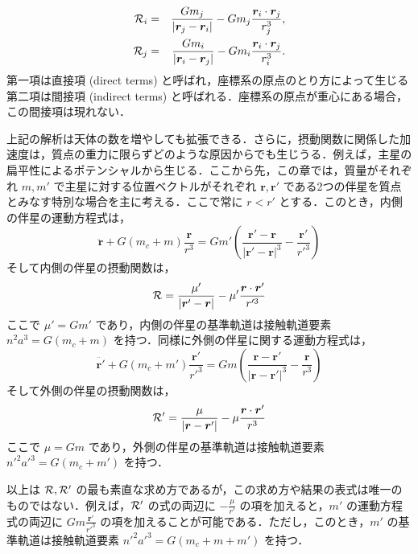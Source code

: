 \documentclass[11pt,a4paper,oneside,onecolumn]{jarticle}
\begin{document}
\begin{eqnarray}
{\cal R}_i & = & \frac{G m_j}{ |{\bm r}_j - {\bm r}_i| } - G m_j \frac{ {\bm r}_i \cdot {\bm r}_j }{r_j^3}, \\
{\cal R}_j & = & \frac{G m_i}{ |{\bm r}_i - {\bm r}_j| } - G m_i \frac{ {\bm r}_i \cdot {\bm r}_j }{r_i^3}.
\end{eqnarray}
第一項は直接項 (direct terms) と呼ばれ，座標系の原点のとり方によって生じる第二項は間接項 (indirect terms) と呼ばれる．座標系の原点が重心にある場合，この間接項は現れない．

上記の解析は天体の数を増やしても拡張できる．さらに，摂動関数に関係した加速度は，質点の重力に限らずどのような原因からでも生じうる．例えば，主星の扁平性によるポテンシャルから生じる．ここから先，この章では，質量がそれぞれ $m, m'$ で主星に対する位置ベクトルがそれぞれ ${\bm r}, {\bm r'}$ である2つの伴星を質点とみなす特別な場合を主に考える．ここで常に $r < r'$ とする．このとき，内側の伴星の運動方程式は，
\begin{equation}
\ddot{\bm r} + G (m_c + m) \frac{{\bm r}}{r^3} = G m' \left( \frac{{\bm r'} - {\bm r}}{| {\bm r'} - {\bm r} |^3} - \frac{{\bm r'}}{r'^3} \right)
\end{equation}
そして内側の伴星の摂動関数は，
\begin{equation}
{\cal R} = \frac{\mu'}{ |{\bm r'} - {\bm r}| } - \mu' \frac{ {\bm r} \cdot {\bm r'} }{r'^3}
\end{equation}
ここで $\mu' = G m'$ であり，内側の伴星の基準軌道は接触軌道要素 $n^2 a^3 = G (m_c + m)$ を持つ．同様に外側の伴星に関する運動方程式は，
\begin{equation}
\ddot{\bm r'} + G (m_c + m') \frac{{\bm r'}}{r'^3} = G m \left( \frac{{\bm r} - {\bm r'}}{| {\bm r} - {\bm r'} |^3} - \frac{{\bm r}}{r^3} \right)
\end{equation}
そして外側の伴星の摂動関数は，
\begin{equation}
{\cal R'} = \frac{\mu}{ |{\bm r} - {\bm r'}| } - \mu \frac{ {\bm r} \cdot {\bm r'} }{r^3}
\end{equation}
ここで $\mu = G m$ であり，外側の伴星の基準軌道は接触軌道要素 $n'^2 a'^3 = G (m_c + m')$ を持つ．

以上は ${\cal R}, {\cal R'}$ の最も素直な求め方であるが，この求め方や結果の表式は唯一のものではない．例えば，${\cal R'}$ の式の両辺に $- \frac{\mu}{r'}$ の項を加えると，$m'$ の運動方程式の両辺に $G m \frac{{\bm r'}}{r'^3}$ の項を加えることが可能である．ただし，このとき，$m'$ の基準軌道は接触軌道要素 $n'^2 a'^3 = G (m_c + m + m')$ を持つ．
\end{document}
